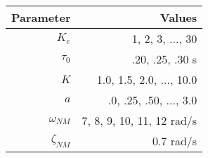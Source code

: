 \begin{tabular}{*{2}{r}}
    \toprule
    Parameter     & Values                        \\
    \midrule
    $K_e$         & 1, 2, 3, $\ldots$, 30         \\
    $\tau_0$      & .20, .25, .30 s               \\
    $K$           & 1.0, 1.5, 2.0, $\ldots$, 10.0 \\
    $a$           & .0, .25, .50, $\ldots$, 3.0   \\
    $\omega_{NM}$ & 7, 8, 9, 10, 11, 12 rad/s     \\
    $\zeta_{NM}$  & 0.7 rad/s                     \\
    \bottomrule
\end{tabular}
